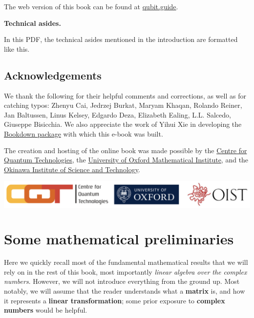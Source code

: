 \documentclass[fleqn,a4paper]{article}
\newenvironment{idea}{\everypar{\setlength{\parindent}{1.5em}}}{}
\newenvironment{technical}[1]{\textbf{#1.}\par\vspace{.5\baselineskip}\everypar{\setlength{\parindent}{1.5em}}}{}
\let\oldsection\section
\renewcommand\section{\clearpage\oldsection}
\theoremstyle{definition}
\theoremstyle{definition}
\theoremstyle{definition}
\theoremstyle{definition}
\theoremstyle{remark}
\begin{document}
\begin{idea}
The web version of this book can be found at \href{https://qubit.guide}{qubit.guide}.

\end{idea}

\begin{technical}{Technical asides}
In this PDF, the technical asides mentioned in the introduction are formatted like this.

\end{technical}

\hypertarget{acknowledgements}{%
\subsection*{Acknowledgements}\label{acknowledgements}}

We thank the following for their helpful comments and corrections, as well as for catching typos: Zhenyu Cai, Jedrzej Burkat, Maryam Khaqan, Rolando Reiner, Jan Baltussen, Linus Kelsey, Edgardo Deza, Elizabeth Ealing, L.L. Salcedo, Giuseppe Bisicchia.
We also appreciate the work of Yihui Xie in developing the \href{https://bookdown.org/yihui/bookdown/}{Bookdown package} with which this e-book was built.

The creation and hosting of the online book was made possible by the \href{https://cqt.quantumlah.org/}{Centre for Quantum Technologies}, the \href{https://www.maths.ox.ac.uk/}{University of Oxford Mathematical Institute}, and the \href{https://www.oist.jp/}{Okinawa Institute of Science and Technology}.

\begin{center}\includegraphics[width=0.9\linewidth]{images/sponsors} \end{center}

\pagestyle{fancy}

\hypertarget{some-mathematical-preliminaries}{%
\section*{Some mathematical preliminaries}\label{some-mathematical-preliminaries}}

Here we quickly recall most of the fundamental mathematical results that we will rely on in the rest of this book, most importantly \emph{linear algebra over the complex numbers}.
However, we will not introduce everything from the ground up.
Most notably, we will assume that the reader understands what a \textbf{matrix} is, and how it represents a \textbf{linear transformation}; some prior exposure to \textbf{complex numbers} would be helpful.
\end{document}
